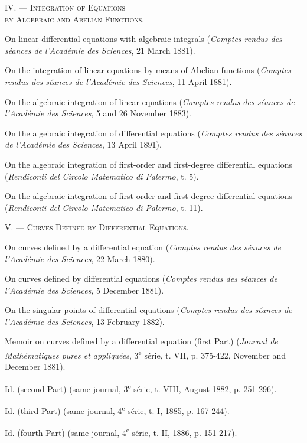 \documentclass[11pt]{article}
\begin{document}
\begin{center}
{\scshape IV. — Integration of Equations}\\
{\scshape by Algebraic and Abelian Functions.}
\end{center}

\begin{description}[leftmargin=3.4em,labelwidth=2.8em,style=nextline]
\item[7.] On linear differential equations with algebraic integrals (\emph{Comptes rendus des séances de l’Académie des Sciences}, 21 March 1881).
\item[10.] On the integration of linear equations by means of Abelian functions (\emph{Comptes rendus des séances de l’Académie des Sciences}, 11 April 1881).
\item[40.] On the algebraic integration of linear equations (\emph{Comptes rendus des séances de l’Académie des Sciences}, 5 and 26 November 1883).
\item[124.] On the algebraic integration of differential equations (\emph{Comptes rendus des séances de l’Académie des Sciences}, 13 April 1891).
\item[219.] On the algebraic integration of first-order and first-degree differential equations (\emph{Rendiconti del Circolo Matematico di Palermo}, t. 5).
\item[221.] On the algebraic integration of first-order and first-degree differential equations (\emph{Rendiconti del Circolo Matematico di Palermo}, t. 11).
\end{description}

\begin{center}
{\scshape V. — Curves Defined by Differential Equations.}
\end{center}

\begin{description}[leftmargin=3.4em,labelwidth=2.8em,style=nextline]
\item[3.] On curves defined by a differential equation (\emph{Comptes rendus des séances de l’Académie des Sciences}, 22 March 1880).
\item[20.] On curves defined by differential equations (\emph{Comptes rendus des séances de l’Académie des Sciences}, 5 December 1881).
\item[23.] On the singular points of differential equations (\emph{Comptes rendus des séances de l’Académie des Sciences}, 13 February 1882).
\item[74.] Memoir on curves defined by a differential equation (first Part) (\emph{Journal de Mathématiques pures et appliquées}, 3\textsuperscript{e} série, t. VII, p. 375-422, November and December 1881).
\item[75.] Id. (second Part) (same journal, 3\textsuperscript{e} série, t. VIII, August 1882, p. 251-296).
\item[76.] Id. (third Part) (same journal, 4\textsuperscript{e} série, t. I, 1885, p. 167-244).
\item[77.] Id. (fourth Part) (same journal, 4\textsuperscript{e} série, t. II, 1886, p. 151-217).
\end{description}
\end{document}
